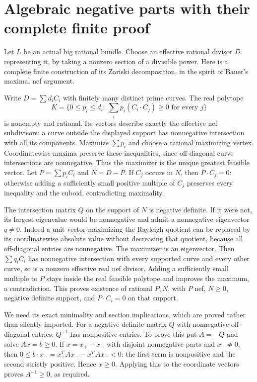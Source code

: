 \documentclass[11pt]{article}
\begin{document}
\section{Algebraic negative parts with their complete finite proof}
Let $L$ be an actual big rational bundle. Choose an effective rational
divisor $D$ representing it, by taking a nonzero section of a
divisible power. Here is a complete finite construction of its
Zariski decomposition, in the spirit of Bauer's maximal nef argument.

Write $D=\sum d_iC_i$ with finitely many distinct prime curves.
The real polytope
\[
 K=\{0\leq p_i\leq d_i:\ \sum_i p_i(C_i\cdot C_j)\geq0
                                      \text{ for every }j\}
\]
is nonempty and rational. Its vectors describe exactly the effective
nef subdivisors: a curve outside the displayed support has
nonnegative intersection with all its components. Maximize
$\sum p_i$ and choose a rational maximizing vertex. Coordinatewise
maxima preserve these inequalities, since off-diagonal curve
intersections are nonnegative. Thus the maximizer is the unique
greatest feasible vector. Let $P=\sum p_iC_i$ and $N=D-P$.
If $C_j$ occurs in $N$, then $P\cdot C_j=0$: otherwise adding
a sufficiently small positive multiple of $C_j$ preserves every
inequality and the cuboid, contradicting maximality.

The intersection matrix $Q$ on the support of $N$ is negative
definite. If it were not, its largest eigenvalue would be nonnegative
and admit a nonnegative eigenvector $q\ne0$. Indeed a unit vector
maximizing the Rayleigh quotient can be replaced by its coordinatewise
absolute value without decreasing that quotient, because all
off-diagonal entries are nonnegative. The maximizer is an eigenvector.
Then $\sum q_iC_i$ has nonnegative intersection with every supported
curve and every other curve, so is a nonzero effective real nef
divisor. Adding a sufficiently small multiple to $P$ stays inside
the real feasible polytope and improves the maximum, a contradiction.
This proves existence of rational $P,N$, with $P$ nef, $N\geq0$,
negative definite support, and $P\cdot C_i=0$ on that support.

We need its exact minimality and section implications, which are
proved rather than silently imported. For a negative definite
matrix $Q$ with nonnegative off-diagonal entries, $Q^{-1}$ has
nonpositive entries. To prove this put $A=-Q$ and solve $Ax=b\geq0$.
If $x=x_+-x_-$ with disjoint nonnegative parts and $x_-\ne0$, then
$0\leq b\cdot x_-=x_+^TAx_--x_-^TAx_-<0$:
the first term is nonpositive and the second strictly positive.
Hence $x\geq0$. Applying this to the coordinate vectors proves
$A^{-1}\geq0$, as required.
\end{document}
